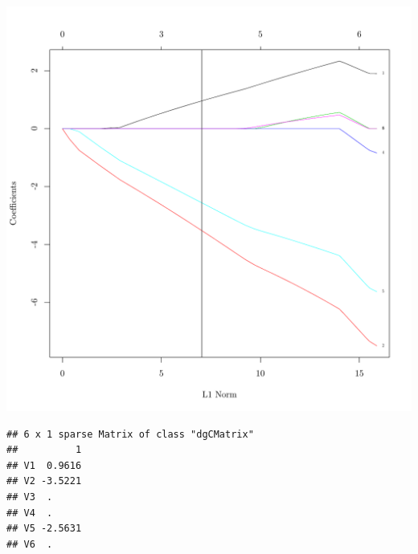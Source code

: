 \documentclass{article}
\begin{document}
\begin{knitrout}
{\centering \includegraphics[width=\maxwidth]{figure/nmf-metagene-glmnet-plots-2} 

}


\begin{kframe}\begin{alltt}
\hlopt{$}  \hlopt{$}
\end{alltt}
\begin{verbatim}
## 6 x 1 sparse Matrix of class "dgCMatrix"
##          1
## V1  0.9616
## V2 -3.5221
## V3  .     
## V4  .     
## V5 -2.5631
## V6  .
\end{verbatim}
\begin{alltt}
\end{alltt}
\end{kframe}


\end{knitrout}
\end{document}
